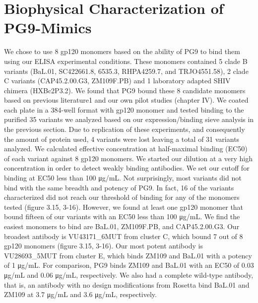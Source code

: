 \section{Biophysical Characterization of PG9-Mimics}
We chose to use 8 gp120 monomers based on the ability of PG9 to bind them using our ELISA experimental conditions. These monomers contained 5 clade B variants (BaL.01, SC422661.8, 6535.3, RHPA4259.7, and TRJO4551.58), 2 clade C variants (CAP45.2.00.G3, ZM109F.PB) and 1 laboratory adapted SHIV chimera (HXBc2P3.2). We found that PG9 bound these 8 candidate monomers based on previous literature1 and our own pilot studies (chapter IV). We coated each plate in a 384-well format with gp120 monomer and tested binding to the purified 35 variants we analyzed based on our expression/binding sieve analysis in the previous section. Due to replication of these experiments, and consequently the amount of protein used, 4 variants were lost leaving a total of 31 variants analyzed. We calculated effective concentration at half-maximal binding (EC50) of each variant against 8 gp120 monomers. We started our dilution at a very high concentration in order to detect weakly binding antibodies. We set our cutoff for binding at EC50 less than 100 μg/mL.
Not surprisingly, most variants did not bind with the same breadth and potency of PG9. In fact, 16 of the variants characterized did not reach our threshold of binding for any of the monomers tested (figure 3.15, 3-16). However, we found at least one gp120 monomer that bound fifteen of our variants with an EC50 less than 100 μg/mL. We find the easiest monomers to bind are BaL.01, ZM109F.PB, and CAP45.2.00.G3. Our broadest antibody is VU43171_6MUT from cluster C, which bound 7 out of 8 gp120   monomers (figure 3.15, 3-16). Our most potent antibody is VU28693_5MUT from cluster E, which binds ZM109 and BaL.01 with a potency of 1 μg/mL. For comparison, PG9 binds ZM109 and BaL.01 with an EC50 of 0.03 μg/mL and 0.06 μg/mL, respectively. We also had a complete wild-type antibody, that is, an antibody with no design modifications from Rosetta bind BaL.01 and ZM109 at 3.7 μg/mL and 3.6 μg/mL, respectively.

